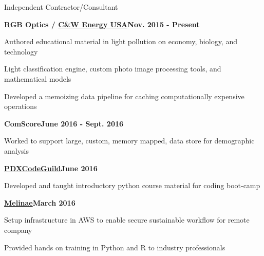 \documentclass{article}
\newenvironment{**mylist}[2]{
  \subsubsection*{#1\hfill\small#2}
  \small
  \begin{list}{}{}
   \setlength{\topsep}{0pt}
   \setlength{\itemsep}{1pt}
   \setlength{\parskip}{0pt}
   \setlength{\parsep}{0pt}}{\end{list}\normalsize}
\newcommand{\LU}[1]{\hspace{-1em}{\bf Languages Used : #1}}
\begin{document}
\begin{**mylist}{Independent \tabb Contractor/Consultant}{}
\item \hspace{-1em}
  {\bf{RGB Optics / }}\href{http://cwenergyusa.com/star-friendly/}{\bf{C\&W Energy USA}}\hfill{\bf{Nov. 2015 - Present}}
\item Authored educational material in light pollution on economy, biology, and technology
\item Light classification engine, custom photo image processing tools, and mathematical models
\item Developed a memoizing data pipeline for caching computationally expensive operations
\item \hspace{-1em}
  {\bf{ComScore}}\hfill{\bf{June 2016 - Sept. 2016}}
\item Worked to support large, custom, memory mapped, data store for demographic analysis
\item \hspace{-1em}
  \href{http://pdxcodeguild.com/}{\bf{PDXCodeGuild}}\hfill{\bf{June 2016}}
\item Developed and taught introductory python course material for coding boot-camp
\item \hspace{-1em}
  \href{http://www.melinae.com/}{\bf{Melinae}}\hfill{\bf{March 2016}}
\item Setup infrastructure in AWS to enable secure sustainable workflow for remote company
\item Provided hands on training in Python and R to industry professionals
\item \LU{Python, R, AWS, PostgreSQL, Perl, C++}
\end{**mylist}

\begin{comment}
\vspace{2em}
       {\center {\em\footnotesize continued...}\par}
\end{comment}
\end{document}
